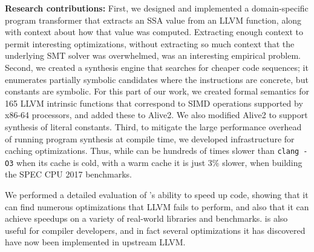 \textbf{Research contributions:}
%
First, we designed and implemented a domain-specific program
transformer that extracts an SSA value from an LLVM function, along
with context about how that value was computed.
%
Extracting enough context to permit interesting optimizations, without
extracting so much context that the underlying SMT solver was
overwhelmed, was an interesting empirical problem.
%
Second, we created a synthesis engine that searches for cheaper code
sequences; it enumerates partially symbolic candidates where the
instructions are concrete, but constants are symbolic.
%
For this part of our work, we created formal semantics for 165 LLVM
intrinsic functions that correspond to SIMD operations supported by
x86-64 processors, and added these to Alive2.
%
We also modified Alive2 to support synthesis of literal constants.
%
Third, to mitigate the large performance overhead of running program
synthesis at compile time, we developed infrastructure for caching
optimizations.
%
Thus, while \minotaur{} can be hundreds of times slower than \texttt{clang
  -O3} when its cache is cold, with a warm cache it is just 3\%
slower, when building the SPEC CPU 2017 benchmarks.



We performed a detailed evaluation of \minotaur's ability to speed up
code, showing that it can find numerous optimizations that LLVM fails
to perform, and also that it can achieve speedups on a variety of
real-world libraries and benchmarks.
%
\minotaur{} is also useful for compiler developers, and in fact several
optimizations it has discovered have now been implemented in upstream
LLVM\@.
